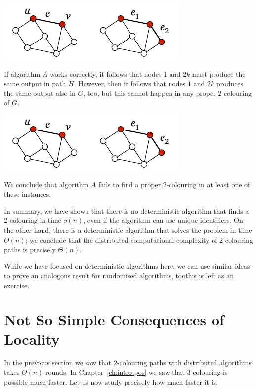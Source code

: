 \begin{center}
    \includegraphics[page=\PIntroLbTwoD]{figs.pdf}
\end{center}
If algorithm $A$ works correctly, it follows that nodes $1$ and $2k$ must produce the same output in path $H$. However, then it follows that nodes $1$ and $2k$ produces the same output also in $G$, too, but this cannot happen in any proper $2$-colouring of $G$.
\begin{center}
    \includegraphics[page=\PIntroLbTwoE]{figs.pdf}
\end{center}
We conclude that algorithm $A$ fails to find a proper $2$-colouring in at least one of these instances.

In summary, we have shown that there is no deterministic algorithm that finds a $2$-colouring in time $o(n)$, even if the algorithm can use unique identifiers. On the other hand, there is a deterministic algorithm that solves the problem in time $O(n)$; we conclude that the distributed computational complexity of $2$-colouring paths is precisely $\Theta(n)$.

While we have focused on deterministic algorithms here, we can use similar ideas to prove an analogous result for randomised algorithms, too\mydash this is left as an exercise.


\section{Not So Simple Consequences of Locality}\label{sec:intro-neg-logstar}

In the previous section we saw that $2$-colouring paths with distributed algorithms takes $\Theta(n)$ rounds. In Chapter~\ref{ch:intro-pos} we saw that $3$-colouring is possible much faster. Let us now study precisely how much faster it is.

